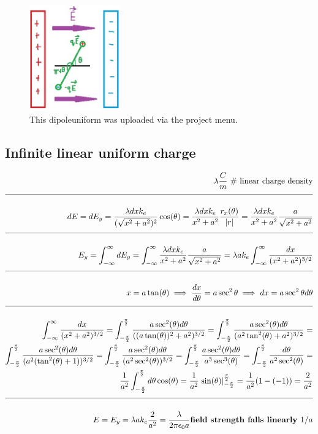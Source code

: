 \documentclass[a4paper]{article}
\newcommand{\eqComment}[1]{\text{  \# #1}}
\newcommand{\n}{\\[1.5ex] \hline \nonumber \\[0ex]}
\newcommand{\m}{\nonumber \\}
\begin{document}
\begin{figure}[h]
\centering
\includegraphics[width=0.35\textwidth]{figures/dipoleuniform.jpg}
\caption{\label{fig:dipoleuniform}This dipoleuniform was uploaded via the project menu.}
\end{figure} \FloatBarrier

\subsection{Infinite linear uniform charge}
\begin{tcolorbox}
\begin{align}
   \lambda \frac{C}{m} \eqComment{linear charge density}
\n dE = dE_y = \frac{\lambda dx k_e}{(\sqrt{x^2 + a^2})^2} \cos(\theta) = \frac{\lambda dx k_e}{x^2 + a^2} \frac{r_x(\theta)}{|r|} = \frac{\lambda dx k_e}{x^2 + a^2} \frac{a}{\sqrt{x^2 + a^2}}
\n E_y = \int_{-\infty}^\infty dE_y = \int_{-\infty}^\infty \frac{\lambda dx k_e}{x^2 + a^2} \frac{a}{\sqrt{x^2 + a^2}} = \lambda a k_e \int_{-\infty}^\infty \frac{dx}{(x^2 + a^2)^{3/2}}
\n x = a \tan(\theta) \implies \frac{dx}{d\theta} = a \sec^2{\theta} \implies dx = a \sec^2{\theta} d\theta
\n \int_{-\infty}^\infty \frac{dx}{(x^2 + a^2)^{3/2}} = \int_{-\frac{\pi}{2}}^{\frac{\pi}{2}} \frac{a \sec^2(\theta) d\theta}{((a \tan(\theta))^2 + a^2)^{3/2}} = \int_{-\frac{\pi}{2}}^{\frac{\pi}{2}} \frac{a \sec^2(\theta) d\theta}{(a^2 \tan^2(\theta) + a^2)^{3/2}} =
\m \int_{-\frac{\pi}{2}}^{\frac{\pi}{2}} \frac{a \sec^2(\theta) d\theta}{(a^2 (\tan^2(\theta) + 1))^{3/2}} = \int_{-\frac{\pi}{2}}^{\frac{\pi}{2}} \frac{a \sec^2(\theta) d\theta}{(a^2 \sec^2(\theta))^{3/2}} = \int_{-\frac{\pi}{2}}^{\frac{\pi}{2}} \frac{a \sec^2(\theta) d\theta}{a^3 \sec^3(\theta)} = \int_{-\frac{\pi}{2}}^{\frac{\pi}{2}} \frac{d\theta}{a^2 \sec^2(\theta)} =
\m \frac{1}{a^2} \int_{-\frac{\pi}{2}}^{\frac{\pi}{2}} d\theta \cos(\theta) = \frac{1}{a^2} \left.\sin(\theta)\right|_{-\frac{\pi}{2}}^{\frac{\pi}{2}} = \frac{1}{a^2} (1 - (-1)) = \frac{2}{a^2}
\n E = E_y = \lambda a k_e \frac{2}{a^2} = \frac{\lambda}{2 \pi \epsilon_0 a} \textbf{field strength falls linearly $1/a$}
\end{align}
\end{tcolorbox}
\end{document}
